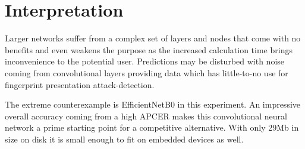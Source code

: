 \section{Interpretation}
Larger networks suffer from a complex set of layers and nodes that come with no benefits and even weakens the purpose as the increased calculation time brings inconvenience to the potential user.
Predictions may be disturbed with noise coming from convolutional layers providing data which has little-to-no use for fingerprint presentation attack-detection.

The extreme counterexample is EfficientNetB0 in this experiment.
An impressive overall accuracy coming from a high APCER makes this convolutional neural network a prime starting point for a competitive alternative.
With only 29Mb in size on disk it is small enough to fit on embedded devices as well.
